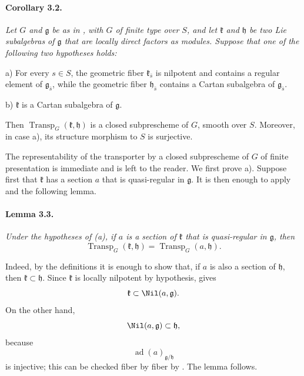 
\paragraph{\textbf{Corollary 3.2.}}
{\itshape Let \(G\) and \(\mathfrak g\) be as in , with \(G\)
of finite type over \(S\), and let \(\mathfrak k\) and
\(\mathfrak h\) be two Lie subalgebras of \(\mathfrak g\) that are
locally direct factors as modules. Suppose that one of the following
two hypotheses holds:

\smallskip
\noindent
\textup{a)}
For every \(s\in S\), the geometric fiber
\(\mathfrak k_{\bar s}\) is nilpotent and contains a regular element
of \(\mathfrak g_{\bar s}\), while the geometric fiber
\(\mathfrak h_{\bar s}\) contains a Cartan subalgebra of
\(\mathfrak g_{\bar s}\).

\smallskip
\noindent
\textup{b)}
\(\mathfrak k\) is a Cartan subalgebra of \(\mathfrak g\).

\smallskip
\noindent
Then \(\operatorname{Transp}_G(\mathfrak k,\mathfrak h)\) is a
closed subprescheme of \(G\), smooth over \(S\). Moreover, in case
\textup{a)}, its structure morphism to \(S\) is surjective.}

The representability of the transporter by a closed subprescheme of
\(G\) of finite presentation is immediate and is left to the
reader. We first prove \textup{a)}. Suppose first
that \(\mathfrak k\) has a section \(a\) that is quasi-regular in
\(\mathfrak g\). It is then enough to apply  and the following
lemma.

\paragraph{\textbf{Lemma 3.3.}}
{\itshape Under the hypotheses of \textup{(a)}, if \(a\) is a
section of \(\mathfrak k\) that is quasi-regular in
\(\mathfrak g\), then
\[
  \operatorname{Transp}_G(\mathfrak k,\mathfrak h)
  =
  \operatorname{Transp}_G(a,\mathfrak h).
\]}

Indeed, by the definitions it is enough to show that, if \(a\) is
also a section of \(\mathfrak h\), then
\(\mathfrak k\subset\mathfrak h\). Since \(\mathfrak k\) is
locally nilpotent by hypothesis,  gives
\[
  \mathfrak k\subset\Nil(a,\mathfrak g).
\]
On the other hand,
\[
  \Nil(a,\mathfrak g)\subset\mathfrak h,
\]
because
\[
  \operatorname{ad}(a)_{\mathfrak g/\mathfrak h}
\]
is injective; this can be checked fiber by fiber by .
The lemma follows.

